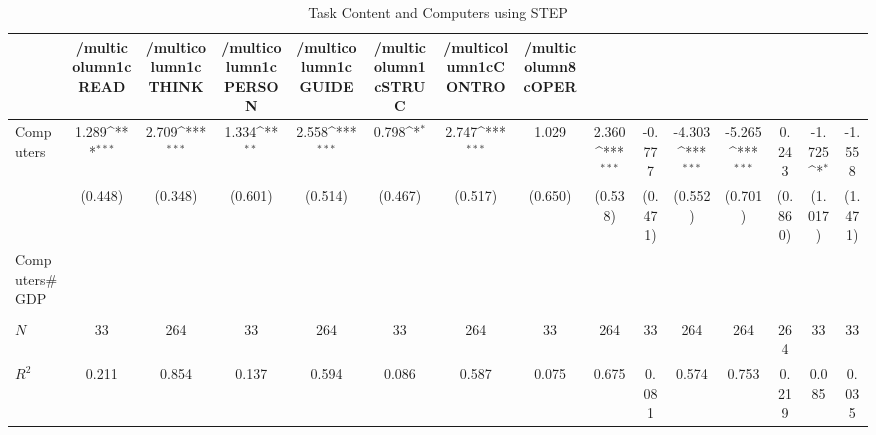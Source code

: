 \begin{table}[htbp]\centering
\def\sym#1{\ifmmode^{#1}\else\(^{#1}\)\fi}
\caption{Task Content and Computers using STEP}
\begin{tabular}{l*{14}{c}}
\hline\hline
            &/multicolumn{1}{c}{READ}&/multicolumn{1}{c}{THINK}&/multicolumn{1}{c}{PERSON}&/multicolumn{1}{c}{GUIDE}&/multicolumn{1}{c}{STRUC}&/multicolumn{1}{c}{CONTRO}&/multicolumn{8}{c}{OPER}                                                                                                                                                       \\
\hline
Computers   &       1.289\sym{***}&       2.709\sym{***}&       1.334\sym{**} &       2.558\sym{***}&       0.798\sym{*}  &       2.747\sym{***}&       1.029         &       2.360\sym{***}&      -0.777         &      -4.303\sym{***}&      -5.265\sym{***}&       0.243         &      -1.725\sym{*}  &      -1.558         \\
            &     (0.448)         &     (0.348)         &     (0.601)         &     (0.514)         &     (0.467)         &     (0.517)         &     (0.650)         &     (0.538)         &     (0.471)         &     (0.552)         &     (0.701)         &     (0.860)         &     (1.017)         &     (1.471)         \\
[1em]
Computers#GDP&                     &                     &                     &                     &                     &                     &                     &                     &                     &                     &                     &                     &                     &                     \\
            &                     &                     &                     &                     &                     &                     &                     &                     &                     &                     &                     &                     &                     &                     \\
\hline
\(N\)       &          33         &         264         &          33         &         264         &          33         &         264         &          33         &         264         &          33         &         264         &         264         &         264         &          33         &          33         \\
\(R^{2}\)   &       0.211         &       0.854         &       0.137         &       0.594         &       0.086         &       0.587         &       0.075         &       0.675         &       0.081         &       0.574         &       0.753         &       0.219         &       0.085         &       0.035         \\
\hline\hline
\end{tabular}
\end{table}
